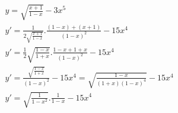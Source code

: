 \begin{ex}
\begin{align}
&y=\sqrt{\frac{x+1}{1-x}}-3x^5\nonumber\\
&y'=\frac{1}{2\sqrt{\frac{x+1}{1-x}}}.\frac{(1-x)+(x+1)}{(1-x)^2}-15x^4\nonumber\\
&y'=\frac{1}{2}\sqrt{\frac{1-x}{1+x}}.\frac{1-x+1+x}{(1-x)^2}-15x^4\nonumber\\
&y'=\frac{\sqrt{\frac{1-x}{1+x}}}{(1-x)^2}-15x^4=\sqrt{\frac{1-x}{(1+x)(1-x)^4}}-15x^4\nonumber\\
&y'=\sqrt{\frac{1}{1-x^2}}.\frac{1}{1-x}-15x^4\nonumber
\end{align}
\end{ex}